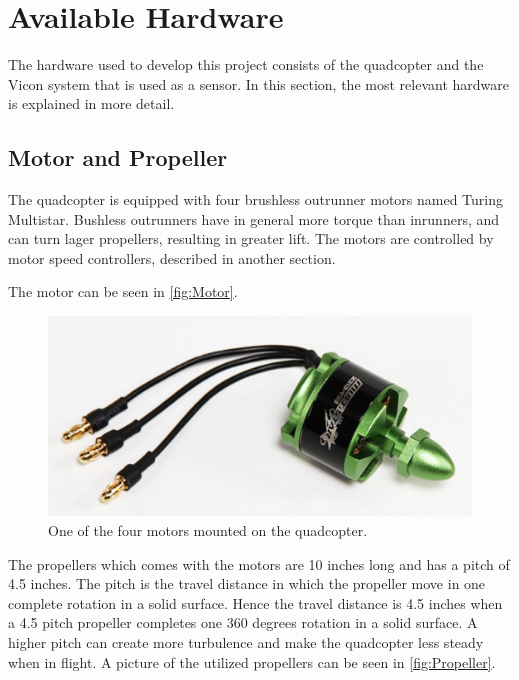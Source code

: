 \section{Available Hardware}
The hardware used to develop this project consists of the quadcopter and the Vicon system that is used as a sensor. In this section, the most relevant hardware is explained in more detail.

\subsection{Motor and Propeller}
The quadcopter is equipped with four brushless outrunner motors named Turing Multistar. Bushless outrunners have in general more torque than inrunners, and can turn lager propellers, resulting in greater lift. The motors are controlled by motor speed controllers, described in another section.

The motor can be seen in \autoref{fig:Motor}.
\begin{figure}[H]
	\centering
	\includegraphics[scale=0.5]{figures/motor.png}
	\caption{One of the four motors mounted on the quadcopter.}
	\label{fig:Motor}
\end{figure} 

The propellers which comes with the motors are 10 inches long and has a pitch of 4.5 inches. The pitch is the travel distance in which the propeller move in one complete rotation in a solid surface. Hence the travel distance is 4.5 inches when a 4.5 pitch propeller completes one 360 degrees rotation in a solid surface. A higher pitch can create more turbulence and make the quadcopter less steady when in flight. A picture of the utilized propellers can be seen in \autoref{fig:Propeller}.

